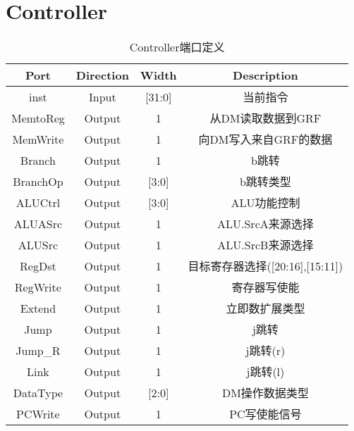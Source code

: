 \documentclass[UTF8]{ctexart}
\begin{document}
\section{Controller}
\begin{table}[H]
	\centering
	\begin{threeparttable}
		\caption{Controller端口定义}
		\begin{tabular}{cccc}
			\toprule
			\rowcolor{mypink}
			\textbf{Port} & \textbf{Direction} & \textbf{Width} & \textbf{Description}            \\
			\midrule
			inst          & Input              & [31:0]         & 当前指令                        \\
			\midrule
			MemtoReg      & Output             & 1              & 从DM读取数据到GRF               \\
			\midrule
			MemWrite      & Output             & 1              & 向DM写入来自GRF的数据           \\
			\midrule
			Branch        & Output             & 1              & b跳转                           \\
			\midrule
			BranchOp      & Output             & [3:0]          & b跳转类型                       \\
			\midrule
			ALUCtrl       & Output             & [3:0]          & ALU功能控制                     \\
			\midrule
			ALUASrc       & Output             & 1              & ALU.SrcA来源选择                \\
			\midrule
			ALUSrc        & Output             & 1              & ALU.SrcB来源选择                \\
			\midrule
			RegDst        & Output             & 1              & 目标寄存器选择([20:16],[15:11]) \\
			\midrule
			RegWrite      & Output             & 1              & 寄存器写使能                    \\
			\midrule
			Extend        & Output             & 1              & 立即数扩展类型                  \\
			\midrule
			Jump          & Output             & 1              & j跳转                           \\
			\midrule
			Jump\_R       & Output             & 1              & j跳转(r)                        \\
			\midrule
			Link          & Output             & 1              & j跳转(l)                        \\
			\midrule
			DataType      & Output             & [2:0]          & DM操作数据类型                  \\
			\midrule
			PCWrite&Output&1&PC写使能信号\\
			\midrule 
		\end{tabular}
	\end{threeparttable}
\end{table}
\end{document}
